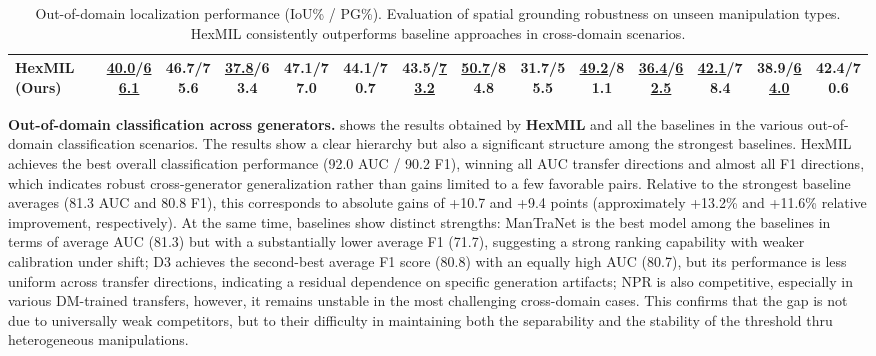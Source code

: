 \documentclass[sigconf, screen, review, anonymous]{acmart}
\begin{document}
\begin{table}[t]
\begin{adjustbox}{width=\textwidth}
\begin{tabular}{L CCCCCCCCCCCC C}
        \textbf{HexMIL (Ours)}
            & \underline{\Huge 40.0}/\underline{\Huge 66.1} & \textbf{\Huge 46.7}/\textbf{\Huge 75.6} & \underline{\Huge 37.8}/\textbf{\Huge 63.4}
            & \textbf{\Huge 47.1}/\textbf{\Huge 77.0} & \textbf{\Huge 44.1}/\textbf{\Huge 70.7} & \textbf{\Huge 43.5}/\underline{\Huge 73.2}
            & \underline{\Huge 50.7}/\textbf{\Huge 84.8} & \textbf{\Huge 31.7}/\textbf{\Huge 55.5} & \underline{\Huge 49.2}/81.1
            & \underline{\Huge 36.4}/\underline{\Huge 62.5} & \underline{\Huge 42.1}/\textbf{\Huge 78.4} & \textbf{\Huge 38.9}/\underline{\Huge 64.0}
            & \textbf{\Huge 42.4}/\textbf{\Huge70.6}\\

        \bottomrule
    \end{tabular}
    \end{adjustbox}
    \caption{%
    Out-of-domain localization performance (IoU\% / PG\%). Evaluation of spatial grounding robustness on unseen manipulation types. HexMIL consistently outperforms baseline approaches in cross-domain scenarios.
    }
    \label{tab:ood_loc}
    \vspace{-1em}
\end{table}

\smallskip
\noindent\textbf{Out-of-domain classification across generators.}
 shows the results obtained by \textbf{HexMIL} and all the baselines in the various out-of-domain classification scenarios. The results show a clear hierarchy but also a significant structure among the strongest baselines. HexMIL achieves the best overall classification performance (92.0 AUC / 90.2 F1), winning all AUC transfer directions and almost all F1 directions, which indicates robust cross-generator generalization rather than gains limited to a few favorable pairs. Relative to the strongest baseline averages (81.3 AUC and 80.8 F1), this corresponds to absolute gains of +10.7 and +9.4 points (approximately +13.2\% and +11.6\% relative improvement, respectively). At the same time, baselines show distinct strengths: ManTraNet is the best model among the baselines in terms of average AUC (81.3) but with a substantially lower average F1 (71.7), suggesting a strong ranking capability with weaker calibration under shift; D3 achieves the second-best average F1 score (80.8) with an equally high AUC (80.7), but its performance is less uniform across transfer directions, indicating a residual dependence on specific generation artifacts; NPR is also competitive, especially in various DM-trained transfers, however, it remains unstable in the most challenging cross-domain cases. This confirms that the gap is not due to universally weak competitors, but to their difficulty in maintaining both the separability and the stability of the threshold thru heterogeneous manipulations.
\end{document}
